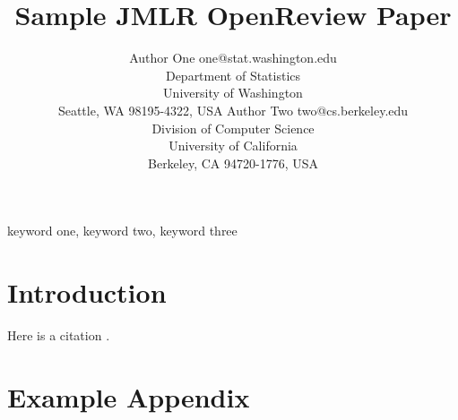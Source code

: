 \documentclass[twoside,11pt]{article}
\begin{document}
\title{Sample JMLR OpenReview Paper}

\author{\name Author One \email one@stat.washington.edu \\
       \addr Department of Statistics\\
       University of Washington\\
       Seattle, WA 98195-4322, USA
       \AND
       \name Author Two \email two@cs.berkeley.edu \\
       \addr Division of Computer Science\\
       University of California\\
       Berkeley, CA 94720-1776, USA}

\maketitle

\begin{abstract}%
\blindtext
\end{abstract}

\begin{keywords}
  keyword one, keyword two, keyword three
\end{keywords}

\section{Introduction}

\blindmathpaper

Here is a citation \cite{chow:68}.


\appendix
\section{Example Appendix}

\blindtext


\end{document}

